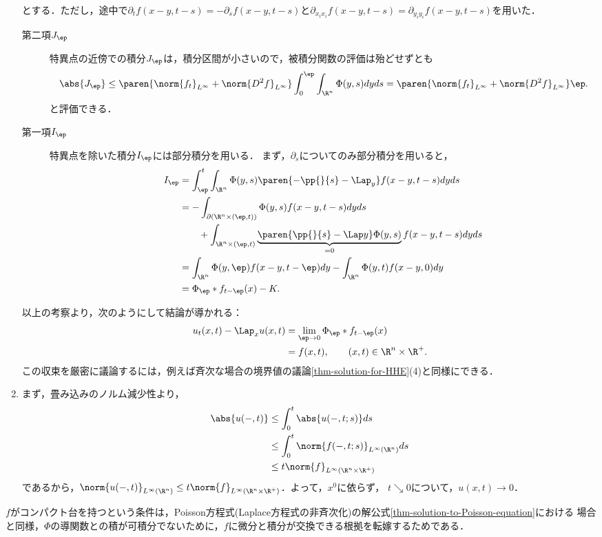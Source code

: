 \documentclass[uplatex,dvipdfmx]{jsreport}
\begin{document}
\begin{Proof}
\begin{enumerate}
\begin{align*}
        \end{align*}
        とする．ただし，途中で$\partial_tf(x-y,t-s)=-\partial_sf(x-y,t-s)$と$\partial_{x_ix_i}f(x-y,t-s)=\partial_{y_iy_i}f(x-y,t-s)$を用いた．
        \begin{description}
            \item[第二項$J_\ep$] 特異点の近傍での積分$J_\ep$は，積分区間が小さいので，被積分関数の評価は殆どせずとも
            \[\abs{J_\ep}\le\paren{\norm{f_t}_{L^\infty}+\norm{D^2f}_{L^\infty}}\int^\ep_0\int_{\R^n}\Phi(y,s)dyds=\paren{\norm{f_t}_{L^\infty}+\norm{D^2f}_{L^\infty}}\ep.\]
            と評価できる．
            \item[第一項$I_\ep$] 特異点を除いた積分$I_\ep$には部分積分を用いる．
            まず，$\partial_s$についてのみ部分積分を用いると，
            \begin{align*}
                I_\ep&=\int^t_\ep\int_{\R^n}\Phi(y,s)\paren{-\pp{}{s}-\Lap_y}f(x-y,t-s)dyds\\
                &=-\int_{\partial(\R^n\times(\ep,t))}\Phi(y,s)f(x-y,t-s)dyds\\
                &\qquad+\int_{\R^n\times(\ep,t)}\underbrace{\paren{\pp{}{s}-\Lap y}\Phi(y,s)}_{=0}f(x-y,t-s)dyds\\
                &=\int_{\R^n}\Phi(y,\ep)f(x-y,t-\ep)dy-\int_{\R^n}\Phi(y,t)f(x-y,0)dy\\
                &=\Phi_\ep*f_{t-\ep}(x)-K.
            \end{align*}
        \end{description}
        以上の考察より，次のようにして結論が導かれる：
        \begin{align*}
            u_t(x,t)-\Lap_xu(x,t)&=\lim_{\ep\to0}\Phi_\ep*f_{t-\ep}(x)\\
            &=f(x,t),\qquad(x,t)\in\R^n\times\R^+.
        \end{align*}
        この収束を厳密に議論するには，例えば斉次な場合の境界値の議論\ref{thm-solution-for-HHE}(4)と同様にできる．
        \item まず，畳み込みのノルム減少性より，
        \begin{align*}
            \abs{u(-,t)}&\le\int^t_0\abs{u(-,t;s)}ds\\
            &\le\int^t_0\norm{f(-,t;s)}_{L^\infty(\R^n)}ds\\
            &\le t\norm{f}_{L^\infty(\R^n\times\R^+)}
        \end{align*}
        であるから，$\norm{u(-,t)}_{L^\infty(\R^n)}\le t\norm{f}_{L^\infty(\R^n\times\R^+)}$．よって，$x^0$に依らず，
        $t\searrow0$について，$u(x,t)\to0$．
    \end{enumerate}
\end{Proof}
\begin{remarks}
    $f$がコンパクト台を持つという条件は，Poisson方程式(Laplace方程式の非斉次化)の解公式\ref{thm-solution-to-Poisson-equation}における
    場合と同様，$\Phi$の導関数との積が可積分でないために，$f$に微分と積分が交換できる根拠を転嫁するためである．
\end{remarks}
\end{document}
